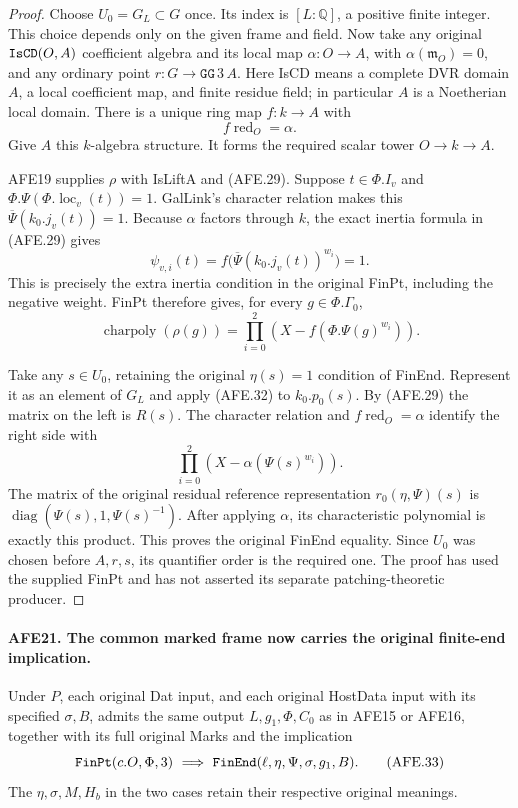 \documentclass[11pt,a4paper]{article}
\numberwithin{equation}{section}
\theoremstyle{remark}\newtheorem{remark}[theorem]{Remark}
\begin{document}
\begin{proof}
Choose \(U_0=G_L\subset G\) once.
Its index is \([L:\mathbb Q]\), a positive finite
integer.  This choice depends only on the given
frame and field.
Now take any original \(\texttt{Is\allowbreak CD}(O,A)\)
coefficient algebra and its local map
\(\alpha:O\to A\), with
\(\alpha(\mathfrak m_O)=0\), and any ordinary point
\(r:G\to\texttt{GG}\,3\,A\).
Here IsCD means a complete DVR domain \(A\), a
local coefficient map, and finite residue field;
in particular \(A\) is a Noetherian local domain.
There is a unique ring map \(f:k\to A\) with
\[
                         f\operatorname{red}_O=\alpha.
 \]
Give \(A\) this \(k\)-algebra structure.
It forms the required scalar tower \(O\to k\to A\).

AFE19 supplies \(\rho\) with IsLiftA and (AFE.29).
Suppose \(t\in\Phi.I_v\) and
\(\Phi.\Psi(\Phi.\operatorname{loc}_v(t))=1\).
GalLink's character relation makes this
\(\overline\Psi(k_0.j_v(t))=1\).
Because \(\alpha\) factors through \(k\), the exact
inertia formula in (AFE.29) gives
\[
                    \psi_{v,i}(t)
                       =f\bigl(\overline\Psi(k_0.j_v(t))^{w_i}\bigr)
                       =1.
 \]
This is precisely the extra inertia condition in
the original FinPt, including the negative weight.
FinPt therefore gives, for every \(g\in\Phi.\Gamma_0\),
\[
       \operatorname{charpoly}(\rho(g))
         =\prod_{i=0}^{2}
                 \left(X-f(\Phi.\Psi(g)^{w_i})\right).
                                                        \tag{AFE.32}
\]

Take any \(s\in U_0\), retaining the original
\(\eta(s)=1\) condition of FinEnd.
Represent it as an element of \(G_L\) and apply
(AFE.32) to \(k_0.p_0(s)\).
By (AFE.29) the matrix on the left is \(R(s)\).
The character relation and \(f\operatorname{red}_O=\alpha\)
identify the right side with
\[
                  \prod_{i=0}^{2}(X-\alpha(\Psi(s)^{w_i})).
 \]
The matrix of the original residual reference
representation \(r_0(\eta,\Psi)(s)\) is
\(\operatorname{diag}(\Psi(s),1,\Psi(s)^{-1})\).
After applying \(\alpha\), its characteristic
polynomial is exactly this product.
This proves the original FinEnd equality.
Since \(U_0\) was chosen before \(A,r,s\), its
quantifier order is the required one.
The proof has used the supplied FinPt and has not
asserted its separate patching-theoretic producer.
\end{proof}

\paragraph{AFE21. The common marked frame now carries the original finite-end implication.}
\label{claim:AFE21}
Under \(P\), each original Dat input, and each original
HostData input with its specified \(\sigma,B\), admits
the same output \(L,g_1,\Phi,C_0\) as in AFE15 or
AFE16, together with its full original Marks and
the implication
\[
          \texttt{Fin\allowbreak Pt}(c.O,\Phi,3)
              \ \Longrightarrow\
          \texttt{Fin\allowbreak End}(\ell,\eta,\Psi,\sigma,g_1,B).
                                                        \tag{AFE.33}
\]
The \(\eta,\sigma,M,H_b\) in the two cases retain
their respective original meanings.
\end{document}
